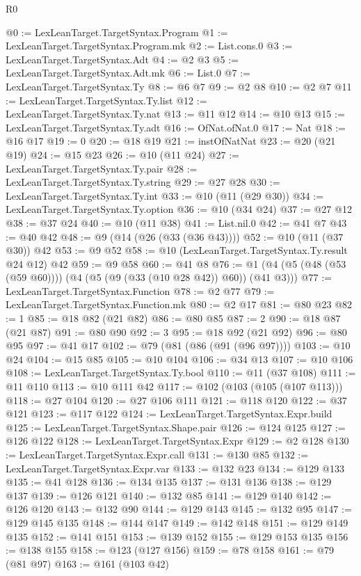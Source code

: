 \begin{lexlean}{R0}
\begin{coremodule}
{{{{{{{{{{{{{{{{{{{{{{{{{{{{{{{{{{{{{{{{{{{{{{{{{{{{{{{{{{{{{{{{{{{{{{{{{{{{{{{{{{{{{{{{{{{{{{{{{{{{{{{{{@0 := LexLeanTarget.TargetSyntax.Program
@1 := LexLeanTarget.TargetSyntax.Program.mk
@2 := List.cons.{0}
@3 := LexLeanTarget.TargetSyntax.Adt
@4 := @2 @3
@5 := LexLeanTarget.TargetSyntax.Adt.mk
@6 := List.{0}
@7 := LexLeanTarget.TargetSyntax.Ty
@8 := @6 @7
@9 := @2 @8
@10 := @2 @7
@11 := LexLeanTarget.TargetSyntax.Ty.list
@12 := LexLeanTarget.TargetSyntax.Ty.nat
@13 := @11 @12
@14 := @10 @13
@15 := LexLeanTarget.TargetSyntax.Ty.adt
@16 := OfNat.ofNat.{0}
@17 := Nat
@18 := @16 @17
@19 := 0
@20 := @18 @19
@21 := instOfNatNat
@23 := @20 (@21 @19)
@24 := @15 @23
@26 := @10 (@11 @24)
@27 := LexLeanTarget.TargetSyntax.Ty.pair
@28 := LexLeanTarget.TargetSyntax.Ty.string
@29 := @27 @28
@30 := LexLeanTarget.TargetSyntax.Ty.int
@33 := @10 (@11 (@29 @30))
@34 := LexLeanTarget.TargetSyntax.Ty.option
@36 := @10 (@34 @24)
@37 := @27 @12
@38 := @37 @24
@40 := @10 (@11 @38)
@41 := List.nil.{0}
@42 := @41 @7
@43 := @40 @42
@48 := @9 (@14 (@26 (@33 (@36 @43))))
@52 := @10 (@11 (@37 @30)) @42
@53 := @9 @52
@58 := @10 (LexLeanTarget.TargetSyntax.Ty.result @24 @12) @42
@59 := @9 @58
@60 := @41 @8
@76 := @1 (@4 (@5 (@48 (@53 (@59 @60)))) (@4 (@5 (@9 (@33 (@10 @28 @42)) @60)) (@41 @3)))
@77 := LexLeanTarget.TargetSyntax.Function
@78 := @2 @77
@79 := LexLeanTarget.TargetSyntax.Function.mk
@80 := @2 @17
@81 := @80 @23
@82 := 1
@85 := @18 @82 (@21 @82)
@86 := @80 @85
@87 := 2
@90 := @18 @87 (@21 @87)
@91 := @80 @90
@92 := 3
@95 := @18 @92 (@21 @92)
@96 := @80 @95
@97 := @41 @17
@102 := @79 (@81 (@86 (@91 (@96 @97))))
@103 := @10 @24
@104 := @15 @85
@105 := @10 @104
@106 := @34 @13
@107 := @10 @106
@108 := LexLeanTarget.TargetSyntax.Ty.bool
@110 := @11 (@37 @108)
@111 := @11 @110
@113 := @10 @111 @42
@117 := @102 (@103 (@105 (@107 @113)))
@118 := @27 @104
@120 := @27 @106 @111
@121 := @118 @120
@122 := @37 @121
@123 := @117 @122
@124 := LexLeanTarget.TargetSyntax.Expr.build
@125 := LexLeanTarget.TargetSyntax.Shape.pair
@126 := @124 @125
@127 := @126 @122
@128 := LexLeanTarget.TargetSyntax.Expr
@129 := @2 @128
@130 := LexLeanTarget.TargetSyntax.Expr.call
@131 := @130 @85
@132 := LexLeanTarget.TargetSyntax.Expr.var
@133 := @132 @23
@134 := @129 @133
@135 := @41 @128
@136 := @134 @135
@137 := @131 @136
@138 := @129 @137
@139 := @126 @121
@140 := @132 @85
@141 := @129 @140
@142 := @126 @120
@143 := @132 @90
@144 := @129 @143
@145 := @132 @95
@147 := @129 @145 @135
@148 := @144 @147
@149 := @142 @148
@151 := @129 @149 @135
@152 := @141 @151
@153 := @139 @152
@155 := @129 @153 @135
@156 := @138 @155
@158 := @123 (@127 @156)
@159 := @78 @158
@161 := @79 (@81 @97)
@163 := @161 (@103 @42)
}}}}}}}}}}}}}}}}}}}}}}}}}}}}}}}}}}}}}}}}}}}}}}}}}}}}}}}}}}}}}}}}}}}}}}}}}}}}}}}}}}}}}}}}}}}}}}}}}}}}}}}}}
\end{coremodule}
\end{lexlean}
